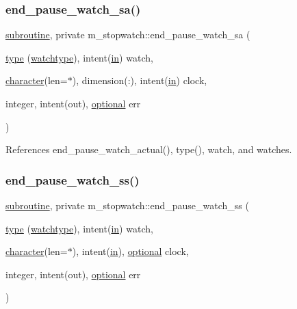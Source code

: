 \subsubsection{\texorpdfstring{end\+\_\+pause\+\_\+watch\+\_\+sa()}{end\_pause\_watch\_sa()}}
{\footnotesize\ttfamily \hyperlink{M__stopwatch_83_8txt_acfbcff50169d691ff02d4a123ed70482}{subroutine}, private m\+\_\+stopwatch\+::end\+\_\+pause\+\_\+watch\+\_\+sa (\begin{DoxyParamCaption}\item[{\hyperlink{stop__watch_83_8txt_a70f0ead91c32e25323c03265aa302c1c}{type} (\hyperlink{structm__stopwatch_1_1watchtype}{watchtype}), intent(\hyperlink{M__journal_83_8txt_afce72651d1eed785a2132bee863b2f38}{in})}]{watch,  }\item[{\hyperlink{option__stopwatch_83_8txt_abd4b21fbbd175834027b5224bfe97e66}{character}(len=$\ast$), dimension(\+:), intent(\hyperlink{M__journal_83_8txt_afce72651d1eed785a2132bee863b2f38}{in})}]{clock,  }\item[{integer, intent(out), \hyperlink{option__stopwatch_83_8txt_aa4ece75e7acf58a4843f70fe18c3ade5}{optional}}]{err }\end{DoxyParamCaption})\hspace{0.3cm}{\ttfamily [private]}}



References end\+\_\+pause\+\_\+watch\+\_\+actual(), type(), watch, and watches.

\mbox{\label{namespacem__stopwatch_a1aeced31682c43f2ead6efaf679cad8c}} 
\subsubsection{\texorpdfstring{end\+\_\+pause\+\_\+watch\+\_\+ss()}{end\_pause\_watch\_ss()}}
{\footnotesize\ttfamily \hyperlink{M__stopwatch_83_8txt_acfbcff50169d691ff02d4a123ed70482}{subroutine}, private m\+\_\+stopwatch\+::end\+\_\+pause\+\_\+watch\+\_\+ss (\begin{DoxyParamCaption}\item[{\hyperlink{stop__watch_83_8txt_a70f0ead91c32e25323c03265aa302c1c}{type} (\hyperlink{structm__stopwatch_1_1watchtype}{watchtype}), intent(\hyperlink{M__journal_83_8txt_afce72651d1eed785a2132bee863b2f38}{in})}]{watch,  }\item[{\hyperlink{option__stopwatch_83_8txt_abd4b21fbbd175834027b5224bfe97e66}{character}(len=$\ast$), intent(\hyperlink{M__journal_83_8txt_afce72651d1eed785a2132bee863b2f38}{in}), \hyperlink{option__stopwatch_83_8txt_aa4ece75e7acf58a4843f70fe18c3ade5}{optional}}]{clock,  }\item[{integer, intent(out), \hyperlink{option__stopwatch_83_8txt_aa4ece75e7acf58a4843f70fe18c3ade5}{optional}}]{err }\end{DoxyParamCaption})\hspace{0.3cm}{\ttfamily [private]}}



